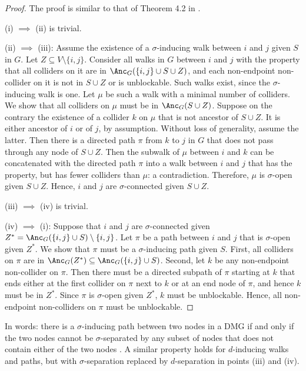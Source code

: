 \begin{proof}
  The proof is similar to that of Theorem 4.2 in \cite{RichardsonSpirtes02}.

  (i) $\implies$ (ii) is trivial.

  (ii) $\implies$ (iii): Assume the existence of a $\sigma$-inducing walk between $i$ and $j$ given $S$ in $G$. 
  Let $Z \subseteq V\setminus\{i,j\}$. 
  Consider all walks in $G$ between $i$ and $j$ with the property that all colliders on it are in $\Anc_{G}(\{i,j\} \cup S \cup Z)$, and each non-endpoint non-collider on it is not in $S \cup Z$ or is unblockable.
  Such walks exist, since the $\sigma$-inducing walk is one. 
  Let $\mu$ be such a walk with a minimal number of colliders.
  We show that all colliders on $\mu$ must be in $\Anc_{G}(S \cup Z)$. 
  Suppose on the contrary the existence of a collider $k$ on $\mu$ that is not ancestor of $S \cup Z$. 
  It is either ancestor of $i$ or of $j$, by assumption.
  Without loss of generality, assume the latter.
  Then there is a directed path $\pi$ from $k$ to $j$ in $G$ that does not pass through any node of $S \cup Z$. 
  Then the subwalk of $\mu$ between $i$ and $k$ can be concatenated with the directed path $\pi$
  into a walk between $i$ and $j$ that has the property, but has fewer colliders than $\mu$: a contradiction. 
  Therefore, $\mu$ is $\sigma$-open given $S \cup Z$.
  Hence, $i$ and $j$ are $\sigma$-connected given $S \cup Z$.

  (iii) $\implies$ (iv) is trivial.

  (iv) $\implies$ (i): Suppose that %
  $i$ and $j$ are $\sigma$-connected given $Z^* = \Anc_{G}(\{i,j\}\cup S) \setminus \{i,j\}$. 
  Let $\pi$ be a path between $i$ and $j$ that is $\sigma$-open given $Z^*$. %
  We show that $\pi$ must be a $\sigma$-inducing path given $S$. 
  First, all colliders on $\pi$ are in $\Anc_G(Z^*) \subseteq \Anc_{G}(\{i,j\}\cup S)$. 
  Second, let $k$ be any non-endpoint non-collider on $\pi$.
  Then there must be a directed subpath of $\pi$ starting at $k$ that ends either at the first collider on $\pi$ next to $k$ or at an end node of $\pi$, and hence $k$ must be in $Z^*$. 
  Since $\pi$ is $\sigma$-open given $Z^*$, $k$ must be unblockable.
  Hence, all non-endpoint non-colliders on $\pi$ must be unblockable.
\end{proof}
In words: there is a $\sigma$-inducing path between two nodes in a DMG if and only if the two nodes cannot be $\sigma$-separated by any subset of nodes that does not contain either of the two nodes .
A similar property holds for $d$-inducing walks and paths, but with $\sigma$-separation replaced by $d$-separation in points (iii) and (iv).


